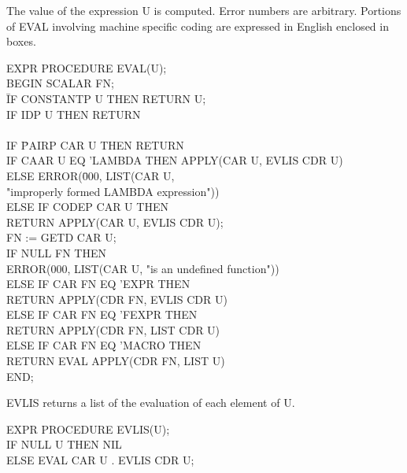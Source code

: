 {The value of the expression U is computed. Error numbers are
arbitrary. Portions of EVAL involving machine specific coding are
expressed in English enclosed in boxes.

{\tt \begin{tabbing} EXPR PROCEDURE EVAL(U); \\ BEGIN SCALAR FN; \\
\hspace*{2em} \= IF CONSTANTP U THEN RETURN U; \\
\> IF IDP U THEN RETURN \\
\> \hspace{1em}  \\
\> IF \= PAIRP CAR U THEN RETURN \\
\> \> IF CAAR U EQ 'LAMBDA THEN APPLY(CAR U, EVLIS CDR U) \\
\> \> ELSE ERROR(\= 000, LIST(CAR U, \\
\> \> \> "improperly formed LAMBDA expression")) \\
\> \> ELSE IF CODEP CAR U THEN \\
\> \> \> RETURN APPLY(CAR U, EVLIS CDR U); \\
\> FN := GETD CAR U; \\
\> IF NULL FN THEN \\
\> \> ERROR(000, LIST(CAR U, "is an undefined function")) \\
\> ELSE IF CAR FN EQ 'EXPR THEN \\
\> \> RETURN APPLY(CDR FN, EVLIS CDR U) \\
\> ELSE IF CAR FN EQ 'FEXPR THEN \\
\> \> RETURN APPLY(CDR FN, LIST CDR U) \\
\> ELSE IF CAR FN EQ 'MACRO THEN \\
\> \> RETURN EVAL APPLY(CDR FN, LIST U) \\
END;
\end{tabbing}}}

{EVLIS returns a list of the evaluation of each element of U.

{\tt \begin{tabbing} EXPR PROCEDURE EVLIS(U); \\
\hspace*{1em} IF NULL U THEN NIL \\
\hspace*{2em} ELSE EVAL CAR U . EVLIS CDR U;
\end{tabbing}}}


